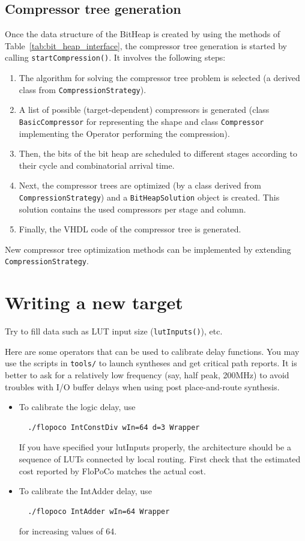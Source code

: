 \documentclass{article}
\begin{document}
\subsection{Compressor tree generation}

Once the data structure of the BitHeap is created by using the methods of Table~\ref{tab:bit_heap_interface}, the compressor tree generation is started by calling \texttt{startCompression()}.
It involves the following steps:
\begin{enumerate}
	\item The algorithm for solving the compressor tree problem is selected (a derived class from \texttt{CompressionStrategy}).
	\item A list of possible (target-dependent) compressors is generated (class \texttt{BasicCompressor} for representing the shape and class \texttt{Compressor} implementing the Operator performing the compression).
	\item Then, the bits of the bit heap are scheduled to different stages according to their cycle and combinatorial arrival time.
	\item Next, the compressor trees are optimized (by a class derived from \texttt{CompressionStrategy}) and a \texttt{BitHeapSolution} object is created. This solution contains the used compressors per stage and column.
	\item Finally, the VHDL code of the compressor tree is generated.
\end{enumerate}

New compressor tree optimization methods can be implemented  by extending \texttt{CompressionStrategy}.



\section{Writing a new target}
Try to fill data such as LUT input size (\texttt{lutInputs()}), etc.

Here are some operators that can be used to calibrate delay functions.
You may use the scripts in \texttt{tools/} to launch syntheses and get critical path reports.
It is better to ask for a relatively low frequency (say, half peak, 200MHz) to avoid troubles with I/O buffer delays when using post place-and-route synthesis.

\begin{itemize}
\item To calibrate the logic delay, use 
\begin{verbatim}
  ./flopoco IntConstDiv wIn=64 d=3 Wrapper
\end{verbatim}
  If you have specified your lutInputs properly, the architecture should be a sequence of LUTs connected by local routing.
  First check that the estimated cost reported by FloPoCo matches the actual cost. 
  
\item To calibrate the IntAdder delay, use
\begin{verbatim}
  ./flopoco IntAdder wIn=64 Wrapper
\end{verbatim}
  for increasing values of 64.
  
\end{itemize}




\end{document}

